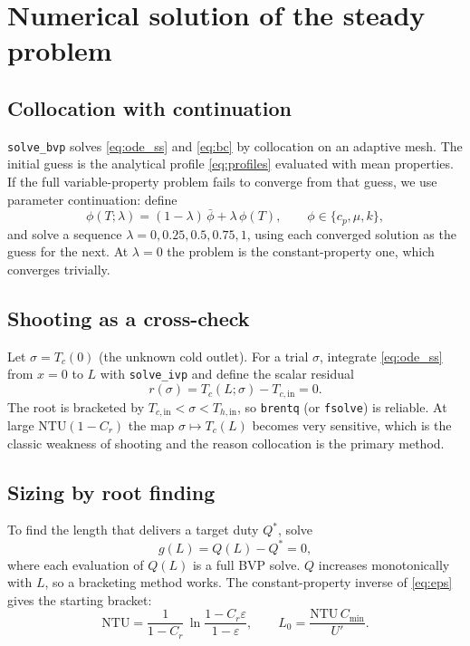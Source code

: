 \documentclass[11pt]{article}
\newcommand{\NTU}{\mathrm{NTU}}
\newcommand{\hin}{_{h,\mathrm{in}}}
\newcommand{\cin}{_{c,\mathrm{in}}}
\begin{document}
\section{Numerical solution of the steady problem}
\label{sec:bvp_num}

\subsection{Collocation with continuation}

\texttt{solve\_bvp} solves \eqref{eq:ode_ss} and \eqref{eq:bc} by collocation on an adaptive mesh. The initial guess is the analytical profile \eqref{eq:profiles} evaluated with mean properties. If the full variable-property problem fails to converge from that guess, we use parameter continuation: define
\begin{equation}
  \phi(T;\lambda) = (1-\lambda)\,\bar\phi + \lambda\,\phi(T), \qquad \phi \in \{c_p, \mu, k\},
\end{equation}
and solve a sequence $\lambda = 0, 0.25, 0.5, 0.75, 1$, using each converged solution as the guess for the next. At $\lambda = 0$ the problem is the constant-property one, which converges trivially.

\subsection{Shooting as a cross-check}

Let $\sigma = T_c(0)$ (the unknown cold outlet). For a trial $\sigma$, integrate \eqref{eq:ode_ss} from $x=0$ to $L$ with \texttt{solve\_ivp} and define the scalar residual
\begin{equation}
  r(\sigma) = T_c(L;\sigma) - T\cin = 0 .
\end{equation}
The root is bracketed by $T\cin < \sigma < T\hin$, so \texttt{brentq} (or \texttt{fsolve}) is reliable. At large $\NTU(1-C_r)$ the map $\sigma \mapsto T_c(L)$ becomes very sensitive, which is the classic weakness of shooting and the reason collocation is the primary method.

\subsection{Sizing by root finding}

To find the length that delivers a target duty $Q^*$, solve
\begin{equation}
  g(L) = Q(L) - Q^* = 0,
\end{equation}
where each evaluation of $Q(L)$ is a full BVP solve. $Q$ increases monotonically with $L$, so a bracketing method works. The constant-property inverse of \eqref{eq:eps} gives the starting bracket:
\begin{equation}
  \NTU = \frac{1}{1 - C_r}\,\ln\!\frac{1 - C_r\varepsilon}{1 - \varepsilon},
  \qquad
  L_0 = \frac{\NTU\, C_{\min}}{U'} .
\end{equation}
\end{document}
